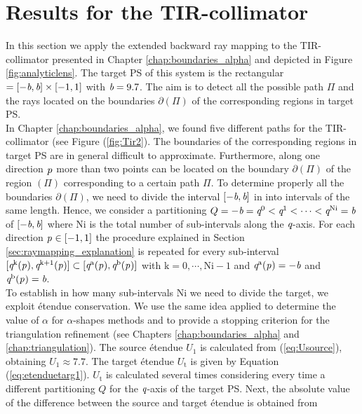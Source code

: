 \section{Results for the TIR-collimator}\label{sec:TIR}
In this section we apply the extended backward ray mapping to the TIR-collimator presented in Chapter \ref{chap:boundaries_alpha} and depicted in Figure \ref{fig:analyticlens}. The target PS of this system is the rectangular $= [-\textit{b}, \textit{b}]\times[-1,1]$ with $\textit{b}=9.7$. The aim is to detect all the possible path $\Pi$ and the rays located on the boundaries $\partial$$(\Pi)$ of the corresponding regions in target PS. 
\\ \indent In Chapter \ref{chap:boundaries_alpha}, we found five different paths for the TIR-collimator (see Figure (\ref{fig:Tir2}). The boundaries of the corresponding regions in target PS  are in general difficult to approximate. Furthermore, along one direction $\textit{p}_{\textrm{} \textit{}}$ more than two points can be located on the boundary $\partial$$(\Pi)$ of the region $(\Pi)$ corresponding to a certain path $\Pi$. To determine properly all the boundaries 
$\partial$$(\Pi)$, we need to divide the interval $[-\textit{b}, \textit{b}]$ in 
 into intervals of the same length. Hence, we consider a partitioning 
$Q = -\textit{b}=\textit{q}^{0}<\textit{q}^{1}<\cdots<\textit{q}^{\textrm{Ni}}=\textit{b}$ of $[-\textit{b}, \textit{b}]$ where $\textrm{Ni}$ is the total number of sub-intervals along the $\textit{q}$-axis.
For each direction $\textit{p}_{\textrm{} \textit{}}\in [-1,1]$ the procedure explained in Section \ref{sec:raymapping_explanation} is repeated for every sub-interval $[\textit{q}^{\textrm{k}}(\textit{p}_{\textrm{} \textit{}}), \textit{q}^{\textrm{k}+1}(\textit{p}_{\textrm{} \textit{}})]\subset [\textit{q}^{\textrm{a}}(\textit{p}_{\textrm{} \textit{}}), \textit{q}^{\textrm{b}}(\textit{p}_{\textrm{} \textit{}})]$ with $\textrm{k}=0, \cdots, \textrm{Ni}-1$ and $\textit{q}^{\textrm{a}}(\textit{p}_{\textrm{} \textit{}}) = -\textit{b}$ and $\textit{q}^{\textrm{b}}(\textit{p}_{\textrm{} \textit{}}) = \textit{b}$.\\ \indent
To establish in how many sub-intervals \textrm{Ni} we need to divide the target, we exploit \'{e}tendue conservation. We use the same idea applied to determine the value of $\alpha$ for $\alpha$-shapes methods and to provide a stopping criterion for the triangulation refinement (see Chapters \ref{chap:boundaries_alpha} and \ref{chap:triangulation}). 
The source \'{e}tendue $U_1$ is calculated from (\ref{eq:Usource}), obtaining $U_1 \approx 7.7$. The target \'{e}tendue $U_\textrm{t}$ is given by Equation (\ref{eq:etenduetarg1}). $U_\textrm{t}$ is calculated several times considering every time a different partitioning $Q$ for the $\textit{q}$-axis of the target PS. Next, the absolute value of the difference between the source and target \'{e}tendue is obtained from
